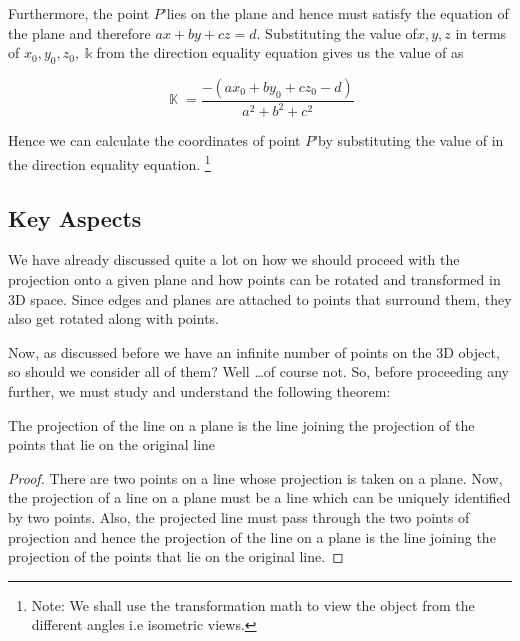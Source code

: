 \documentclass[12pt]{report}
\begin{document}
Furthermore, the point $P’ $lies on the plane and hence must satisfy the equation of the plane and therefore $ax + by + cz  = d$. Substituting the value of$ x,y,z$ in terms of $ x_{0},y_{0},z_{0}, \Bbbk $from the direction equality equation gives us the value of \Bbbk as

\[ \BbbK = \dfrac{- (a x_{0} + b y_{0} + c z_{0} - d)}{ a^2 + b^2 + c^2 } \]

Hence we can calculate the coordinates of point $P’ $by substituting the value of \BbbK in the direction equality equation. \footnote{Note: We shall use the transformation math to view the object from the different angles i.e isometric views.}
\\

\subsection{Key Aspects}

We have already discussed quite a lot on how we should proceed with the projection onto a given plane and how points can be rotated and transformed in 3D space. Since edges and planes are attached to points that surround them, they also get rotated along with points.
\\
\vspace{0.3cm}

Now, as discussed before we have an infinite number of points on the 3D object, so should we consider all of them? Well \dots of course not. So, before proceeding any further, we must study and understand the following theorem:

\begin{theorem}
  The projection of the line on a plane is the line joining the projection of the points that lie on the original line
\end{theorem}
\begin{proof}
  There are two points on a line whose projection is taken on a plane. Now, the projection of a line on a plane must be a line which can be uniquely identified by two points. Also, the projected line must pass through the two points of projection and hence the projection of the line on a plane is the line joining the projection of the points that lie on the original line.
\end{proof}
\end{document}
